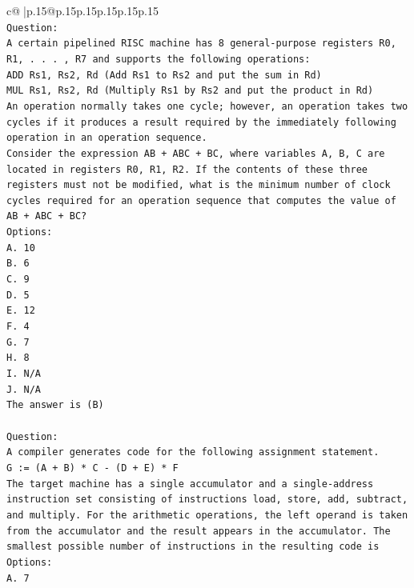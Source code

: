 \documentclass{article}
\begin{document}
{\begin{supertabular}{c@{$\;$}|p{.15\linewidth}@{}p{.15\linewidth}p{.15\linewidth}p{.15\linewidth}p{.15\linewidth}p{.15\linewidth}}
{{{\\ 
\texttt{Question:} \\
\texttt{A certain pipelined RISC machine has 8 general{-}purpose registers R0, R1, . . . , R7 and supports the following operations:} \\
\texttt{ADD Rs1, Rs2, Rd (Add Rs1 to Rs2 and put the sum in Rd)} \\
\texttt{MUL Rs1, Rs2, Rd (Multiply Rs1 by Rs2 and put the product in Rd)} \\
\texttt{An operation normally takes one cycle; however, an operation takes two cycles if it produces a result required by the immediately following operation in an operation sequence.} \\
\texttt{Consider the expression AB + ABC + BC, where variables A, B, C are located in registers R0, R1, R2. If the contents of these three registers must not be modified, what is the minimum number of clock cycles required for an operation sequence that computes the value of AB + ABC + BC?} \\
\texttt{Options:} \\
\texttt{A. 10} \\
\texttt{B. 6} \\
\texttt{C. 9} \\
\texttt{D. 5} \\
\texttt{E. 12} \\
\texttt{F. 4} \\
\texttt{G. 7} \\
\texttt{H. 8} \\
\texttt{I. N/A} \\
\texttt{J. N/A} \\
\texttt{The answer is (B)} \\
\\ 
\texttt{Question:} \\
\texttt{A compiler generates code for the following assignment statement.} \\
\texttt{G := (A + B) * C {-} (D + E) * F} \\
\texttt{The target machine has a single accumulator and a single{-}address instruction set consisting of instructions load, store, add, subtract, and multiply. For the arithmetic operations, the left operand is taken from the accumulator and the result appears in the accumulator. The smallest possible number of instructions in the resulting code is} \\
\texttt{Options:} \\
\texttt{A. 7} \\
}}}
\end{supertabular}}
\end{document}
